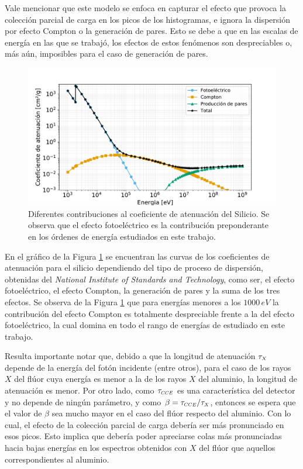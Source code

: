Vale mencionar que este modelo se enfoca en capturar el efecto que provoca la colección parcial de carga en los picos de los histogramas, e ignora la dispersión por efecto Compton o la generación de pares. Esto se debe a que en las escalas de energía en las que se trabajó, los efectos de estos fenómenos son despreciables o, más aún, imposibles para el caso de generación de pares. 
\begin{figure}[h]
    \centering
        \includegraphics[scale=0.5]{Figs/FotoelectricoComptonPares_enSilicio.pdf}
    \caption{Diferentes contribuciones al coeficiente de atenuación del Silicio. Se observa que el efecto fotoeléctrico es la contribución preponderante en los órdenes de energía estudiados en este trabajo.}
    \label{fig:FotoelectricoComptonPares}
\end{figure}
En el gráfico de la Figura \ref{fig:FotoelectricoComptonPares} se encuentran las curvas de los coeficientes de atenuación para el silicio dependiendo del tipo de proceso de dispersión, obtenidas del \textit{National Institute of Standards and Technology}\cite{FotoComptPar}, como ser, el efecto fotoeléctrico, el efecto Compton, la generación de pares y la suma de los tres efectos. Se observa de la Figura \ref{fig:FotoelectricoComptonPares} que para energías menores a los $1000\,\si{eV}$ la contribución del efecto Compton es totalmente despreciable frente a la del efecto fotoeléctrico, la cual domina en todo el rango de energías de estudiado en este trabajo.

Resulta importante notar que, debido a que la longitud de atenuación $\tau_{\scaleto{X}{4pt}}$ depende de la energía del fotón incidente (entre otros), para el caso de los rayos $X$ del flúor cuya energía es menor a la de los rayos $X$ del aluminio, la longitud de atenuación es menor. Por otro lado, como $\tau_{\scaleto{CCE}{4pt}}$ es una característica del detector y no depende de ningún parámetro, y como $\beta = \tau_{\scaleto{CCE}{4pt}}/\tau_{\scaleto{X}{4pt}}$, entonces se espera que el valor de $\beta$ sea mucho mayor en el caso del flúor respecto del aluminio. Con lo cual, el efecto de la colección parcial de carga debería ser más pronunciado en esos picos. Esto implica que debería poder apreciarse colas más pronunciadas hacia bajas energías en los espectros obtenidos con $X$ del flúor que aquellos correspondientes al aluminio.

